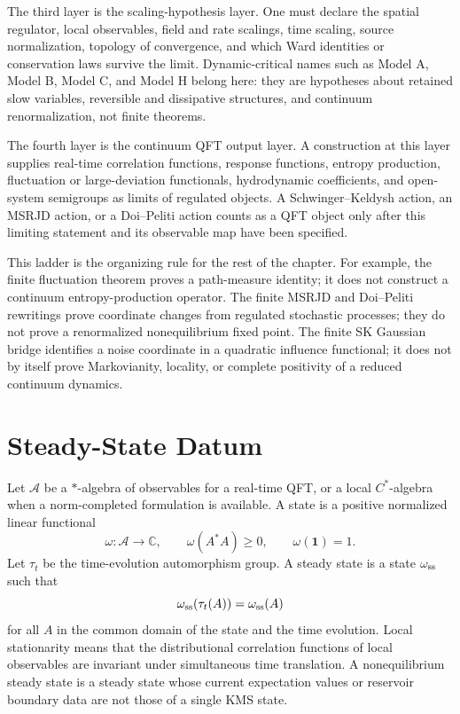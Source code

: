 The third layer is the scaling-hypothesis layer.  One must declare the
spatial regulator, local observables, field and rate scalings, time scaling,
source normalization, topology of convergence, and which Ward identities or
conservation laws survive the limit.  Dynamic-critical names such as
Model A, Model B, Model C, and Model H belong here: they are hypotheses about
retained slow variables, reversible and dissipative structures, and continuum
renormalization, not finite theorems.

The fourth layer is the continuum QFT output layer.  A construction at this
layer supplies real-time correlation functions, response functions, entropy
production, fluctuation or large-deviation functionals, hydrodynamic
coefficients, and open-system semigroups as limits of regulated objects.  A
Schwinger--Keldysh action, an MSRJD action, or a Doi--Peliti action counts as
a QFT object only after this limiting statement and its observable map have
been specified.

This ladder is the organizing rule for the rest of the chapter.  For example,
the finite fluctuation theorem proves a path-measure identity; it does not
construct a continuum entropy-production operator.  The finite MSRJD and
Doi--Peliti rewritings prove coordinate changes from regulated stochastic
processes; they do not prove a renormalized nonequilibrium fixed point.  The
finite SK Gaussian bridge identifies a noise coordinate in a quadratic
influence functional; it does not by itself prove Markovianity, locality, or
complete positivity of a reduced continuum dynamics.

\section{Steady-State Datum}

Let \(\mathcal A\) be a \(*\)-algebra of observables for a real-time QFT,
or a local \(C^*\)-algebra when a norm-completed formulation is available.
A state is a positive normalized linear functional
\[
  \omega:\mathcal A\to\mathbb C,
  \qquad
  \omega(A^*A)\ge0,\qquad
  \omega(\mathbf 1)=1.
\]
Let \(\tau_t\) be the time-evolution automorphism group.  A steady state is a
state \(\omega_{\rm ss}\) such that
\begin{equation}
  \omega_{\rm ss}(\tau_t(A))=\omega_{\rm ss}(A)
  \label{eq:ness-invariant-state}
\end{equation}
for all \(A\) in the common domain of the state and the time evolution.
Local stationarity means that the distributional correlation functions of
local observables are invariant under simultaneous time translation.  A
nonequilibrium steady state is a steady state whose current expectation
values or reservoir boundary data are not those of a single KMS state.

